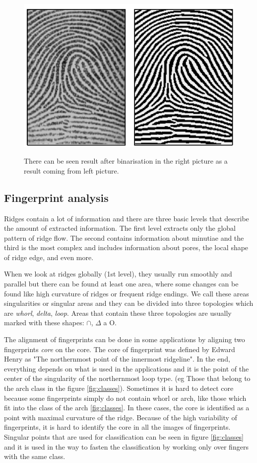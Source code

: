 \begin{figure}[H]
    \centering
        {\includegraphics[width=0.6\linewidth]{obrazky-figures/enhancement.png}}\\
        \caption{There can be seen result after binarisation in the right picture as a result coming from left picture. \cite{maltoni2009handbook}}
\end{figure}

\subsection{Fingerprint analysis}
Ridges contain a lot of information and there are three basic levels that describe the amount of extracted information. The first level extracts only the global pattern of ridge flow. The second contains information about minutiae and the third is the most complex and includes information about pores, the local shape of ridge edge, and even more. \cite{jain2007handbook} \cite{maltoni2009handbook}

When we look at ridges globally (1st level), they usually run smoothly and parallel but there can be found at least one area, where some changes can be found like high curvature of ridges or frequent ridge endings. We call these areas singularities or singular areas and they can be divided into three topologies which are \emph{whorl}, \emph{delta}, \emph{loop}. Areas that contain these three topologies are usually marked with these shapes:  $\cap$, $\Delta$ a O. \cite{jain2007handbook} \cite{maltoni2009handbook}

The alignment of fingerprints can be done in some applications by aligning two fingerprints \emph{core} on the core. The core of fingerprint was defined by Edward Henry as "The northernmost point of the innermost ridgeline". In the end, everything depends on what is used in the applications and it is the point of the center of the singularity of the northernmost loop type. (eg Those that belong to the arch class in the figure \ref{fig:classes}). Sometimes it is hard to detect core because some fingerprints simply do not contain whorl or arch, like those which fit into the class of the arch \ref{fig:classes}. In these cases, the core is identified as a point with maximal curvature of the ridge. Because of the high variability of fingerprints, it is hard to identify the core in all the images of fingerprints. Singular points that are used for classification can be seen in figure \ref{fig:classes} and it is used in the way to fasten the classification by working only over fingers with the same class. \cite{maltoni2009handbook}

